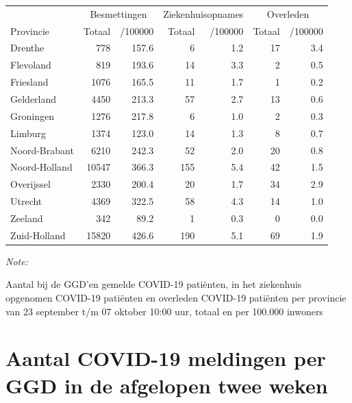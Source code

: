 \documentclass[
  english,
  man,floatsintext]{apa6}
\begin{document}
\begin{table}[H]
\centering
\begin{threeparttable}
\begin{tabular}{lrrrrrr}
\toprule
\multicolumn{1}{c}{ } & \multicolumn{2}{c}{Besmettingen} & \multicolumn{2}{c}{Ziekenhuisopnames} & \multicolumn{2}{c}{Overleden} \\
\cmidrule(l{3pt}r{3pt}){2-3} \cmidrule(l{3pt}r{3pt}){4-5} \cmidrule(l{3pt}r{3pt}){6-7}
Provincie & Totaal & /100000 & Totaal & /100000 & Totaal & /100000\\
\midrule
Drenthe & 778 & 157.6 & 6 & 1.2 & 17 & 3.4\\
Flevoland & 819 & 193.6 & 14 & 3.3 & 2 & 0.5\\
Friesland & 1076 & 165.5 & 11 & 1.7 & 1 & 0.2\\
Gelderland & 4450 & 213.3 & 57 & 2.7 & 13 & 0.6\\
Groningen & 1276 & 217.8 & 6 & 1.0 & 2 & 0.3\\
Limburg & 1374 & 123.0 & 14 & 1.3 & 8 & 0.7\\
Noord-Brabant & 6210 & 242.3 & 52 & 2.0 & 20 & 0.8\\
Noord-Holland & 10547 & 366.3 & 155 & 5.4 & 42 & 1.5\\
Overijssel & 2330 & 200.4 & 20 & 1.7 & 34 & 2.9\\
Utrecht & 4369 & 322.5 & 58 & 4.3 & 14 & 1.0\\
Zeeland & 342 & 89.2 & 1 & 0.3 & 0 & 0.0\\
Zuid-Holland & 15820 & 426.6 & 190 & 5.1 & 69 & 1.9\\
\bottomrule
\end{tabular}
\begin{tablenotes}
\item \textit{Note: } 
\item Aantal bij de GGD’en gemelde COVID-19 patiënten, in het ziekenhuis opgenomen COVID-19 patiënten en overleden COVID-19 patiënten per provincie van 23 september t/m 07 oktober 10:00 uur, totaal en per 100.000 inwoners
\end{tablenotes}
\end{threeparttable}
\end{table}

\newpage

\hypertarget{aantal-covid-19-meldingen-per-ggd-in-de-afgelopen-twee-weken}{%
\section{Aantal COVID-19 meldingen per GGD in de afgelopen twee weken}\label{aantal-covid-19-meldingen-per-ggd-in-de-afgelopen-twee-weken}}
\end{document}
